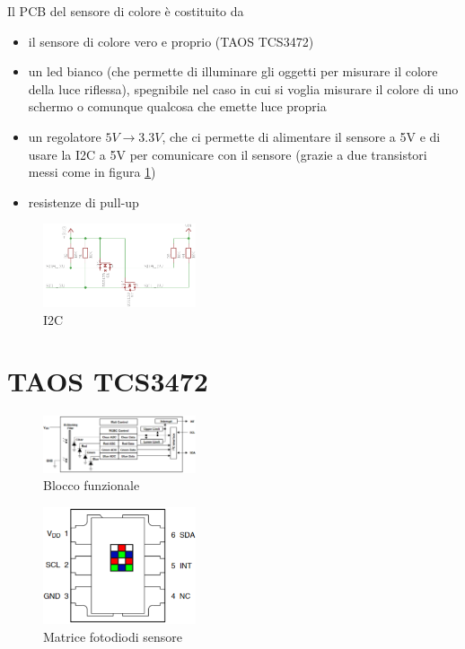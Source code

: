 \documentclass[12pt]{report}
\begin{document}
Il PCB del sensore di colore è costituito da

\begin{itemize}
\item il sensore di colore vero e proprio (TAOS TCS3472)
\item un led bianco (che permette di illuminare gli oggetti per misurare il colore della luce riflessa), spegnibile nel caso in cui si voglia misurare il colore di uno schermo o comunque qualcosa che emette luce propria
\item un regolatore $5V \rightarrow 3.3V$, che ci permette di alimentare il sensore a 5V e di usare la I2C a 5V per comunicare con il sensore (grazie a due transistori messi come in figura \ref{fig:I2C})
\item resistenze di pull-up
\end{itemize}

\begin{figure}
\centering
    \includegraphics[width=0.4\textwidth]{Immagini_sensore/I2C_3V3_to_5.png}
    \caption{I2C}
    \label{fig:I2C}
\end{figure}

\section{TAOS TCS3472}

\begin{figure}
\centering
    \includegraphics[width=0.4\textwidth]{Immagini_sensore/Blocco_funzionale.png}
    \caption{Blocco funzionale}
\end{figure}
    
\begin{figure}
\centering
    \includegraphics[width=0.4\textwidth]{Immagini_sensore/sensore.png}
    \caption{Matrice fotodiodi sensore}
\end{figure}
\end{document}
